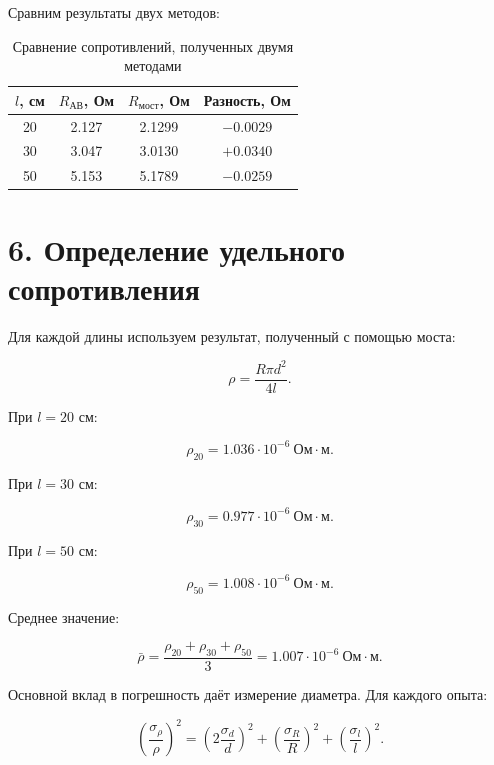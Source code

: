 \documentclass[12pt,a4paper]{article}
\begin{document}
Сравним результаты двух методов:

\begin{table}[H]
\centering
\caption{Сравнение сопротивлений, полученных двумя методами}
\begin{tabular}{c|c|c|c}
\toprule
$l$, см & $R_{\text{АВ}}$, Ом & $R_{\text{мост}}$, Ом & Разность, Ом\\
\midrule
20 & 2.127 & 2.1299 & $-0.0029$\\
30 & 3.047 & 3.0130 & $+0.0340$\\
50 & 5.153 & 5.1789 & $-0.0259$\\
\bottomrule
\end{tabular}
\end{table}


\section*{6. Определение удельного сопротивления}

Для каждой длины используем результат, полученный с помощью моста:

\begin{equation}
\rho=
\frac{R\pi d^2}{4l}.
\end{equation}

При $l=20$ см:

\begin{equation}
\rho_{20}
=
1.036\cdot10^{-6}\ \text{Ом}\cdot\text{м}.
\end{equation}

При $l=30$ см:

\begin{equation}
\rho_{30}
=
0.977\cdot10^{-6}\ \text{Ом}\cdot\text{м}.
\end{equation}

При $l=50$ см:

\begin{equation}
\rho_{50}
=
1.008\cdot10^{-6}\ \text{Ом}\cdot\text{м}.
\end{equation}

Среднее значение:

\begin{equation}
\bar\rho=
\frac{
\rho_{20}+\rho_{30}+\rho_{50}
}{3}
=
1.007\cdot10^{-6}\ \text{Ом}\cdot\text{м}.
\end{equation}

Основной вклад в погрешность даёт измерение диаметра. Для каждого опыта:

\begin{equation}
\left(
\frac{\sigma_\rho}{\rho}
\right)^2
=
\left(
2\frac{\sigma_d}{d}
\right)^2
+
\left(
\frac{\sigma_R}{R}
\right)^2
+
\left(
\frac{\sigma_l}{l}
\right)^2.
\end{equation}
\end{document}
